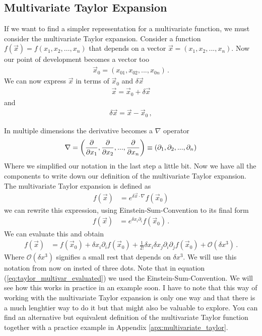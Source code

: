 \subsection{Multivariate Taylor Expansion}
If we want to find a simpler representation for a multivariate function, we must consider the multivariate Taylor expansion. 
Consider a function $f(\vec{x})=f(x_1,x_2, \dots, x_n)$ that depends on a vector $\vec{x}=(x_1,x_2,...,x_n)$. Now our point of development becomes a vector too
\begin{align}
	\vec{x}_0 = (x_{01}, x_{02},...,x_{0n})\,.
\end{align}
We can now express $\vec{x}$ in terms of $\vec{x}_0$ and $\delta \vec{x}$
\begin{align}
	\vec{x} = \vec{x}_0 + \delta\vec{x}
\end{align}
and
\begin{align}
	\delta \vec{x} = \vec{x} - \vec{x}_0\,,
\end{align}

In multiple dimensions the derivative becomes a $\nabla$ operator
\begin{align}
	\nabla = \left(\pdv{x_1}, \pdv{x_2},...,\pdv{x_n}\right) \equiv \left(\partial_1, \partial_2, ..., \partial_n\right)
\end{align}
Where we simplified our notation in the last step a little bit. 
Now we have all the components to write down our definition of the multivariate Taylor expansion. The multivariate Taylor expansion is defined as 
\begin{align}
f(\vec{x})&=e^{\delta \vec{x}\cdot \nabla}f(\vec{x}_0)
\end{align}
we can rewrite this expression, using Einstein-Sum-Convention to its final form
\begin{align}
	f(\vec{x})&=e^{\delta x_i\partial_i}f(\vec{x}_0) \,.
\end{align}
We can evaluate this and obtain
\begin{align}\label{eq:taylor_multivar_evaluated}
	f(\vec{x}) &= f(\vec{x}_0) + \delta x_i \partial_i f(\vec{x}_0) + \frac{1}{2!} \delta x_i \delta x_j \partial_i \partial_j f(\vec{x}_0) + \mathcal{O}(\delta x^3) \,.
\end{align}
Where $\mathcal{O}(\delta x^3)$ signifies a small rest that depends on $\delta x^3$. We will use this notation from now on insted of three dots. Note that in equation (\ref{eq:taylor_multivar_evaluated}) we used the Einstein-Sum-Convention. We will see how this works in practice in an example soon. I have to note that this way of working with the multivariate Taylor expansion is only one way and that there is a much lenghtier way to do it but that might also be valuable to explore. You can find an alternative but equivalent definition of the multivariate Taylor function together with a practice example in Appendix \ref{apx:multivariate_taylor}.







